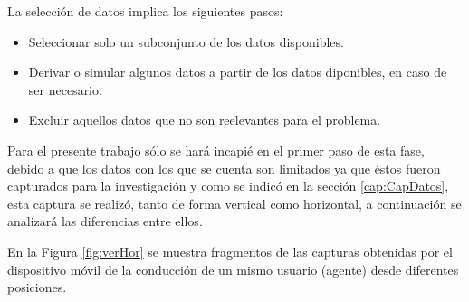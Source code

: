La selecci\'{o}n de datos implica los siguientes pasos:

\begin{itemize}
\item Seleccionar solo un subconjunto de los datos disponibles.
\item Derivar o simular algunos datos a partir de los datos diponibles, en caso de ser necesario.
\item Excluir aquellos datos que no son reelevantes para el problema.
\end{itemize}

Para el presente trabajo s\'{o}lo se har\'{a} incapi\'{e} en el primer paso de esta fase, debido a que los datos con los que se cuenta son limitados ya que \'{e}stos fueron capturados para la investigaci\'{o}n y como se indic\'{o} en la secci\'{o}n \ref{cap:CapDatos}, esta captura se realiz\'{o}, tanto de forma vertical como horizontal, a continuaci\'{o}n se analizar\'{a} las diferencias entre ellos.

\vspace{5mm} %

En la Figura \ref{fig:verHor} se muestra fragmentos de las capturas obtenidas por el dispositivo m\'{o}vil de la conducci\'{o}n de un mismo usuario (agente) desde diferentes posiciones.

